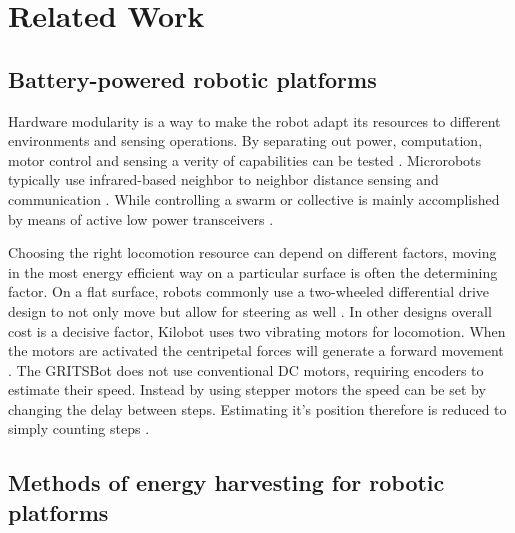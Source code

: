 \chapter{Related Work}
\label{chp:related_work}

\section{Battery-powered robotic platforms}
\label{lab:s1}


Hardware modularity is a way to make the robot adapt its resources to different environments and sensing operations.
By separating out power, computation, motor control and sensing a verity of capabilities can be tested \cite{RN13, RN2}.
Microrobots typically use infrared-based neighbor to neighbor distance sensing and communication \cite{RN3}.
While controlling a swarm or collective is mainly accomplished by means of active low power transceivers \cite{RN13, RN2}. 

Choosing the right locomotion resource can depend on different factors, moving in the most energy efficient way on a particular surface is often the determining factor.
On a flat surface, robots commonly use a two-wheeled differential drive design to not only move but allow for steering as well \cite{RN13, RN2}. 
In other designs overall cost is a decisive factor, Kilobot uses two vibrating motors for locomotion.
When the motors are activated the centripetal forces will generate a forward movement \cite{RN3}.
The GRITSBot does not use conventional DC motors, requiring encoders to estimate their speed. 
Instead by using stepper motors the speed can be set by changing the delay between steps. 
Estimating it's position therefore is reduced to simply counting steps \cite{RN2}. 

\section{Methods of energy harvesting for robotic platforms}
\label{lab:s2}

